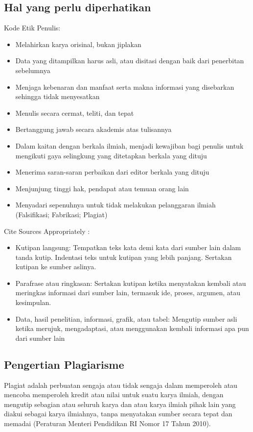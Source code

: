 \documentclass{article}
\begin{document}
\subsection{Hal yang perlu diperhatikan}
Kode Etik Penulis:
\begin{itemize}
    \item Melahirkan karya orisinal, bukan jiplakan
    \item Data yang ditampilkan harus asli, atau disitasi dengan baik dari penerbitan sebelumnya
    \item Menjaga kebenaran dan manfaat serta makna informasi yang disebarkan sehingga tidak menyesatkan
    \item Menulis secara cermat, teliti, dan tepat
    \item Bertanggung jawab secara akademis atas tulisannya
    \item Dalam kaitan dengan berkala ilmiah, menjadi kewajiban bagi penulis untuk mengikuti gaya selingkung yang ditetapkan berkala yang dituju
    \item Menerima saran-saran perbaikan dari editor berkala yang dituju
    \item Menjunjung tinggi hak, pendapat atau temuan orang lain
    \item Menyadari sepenuhnya untuk tidak melakukan pelanggaran ilmiah (Falsifikasi; Fabrikasi; Plagiat)
\end{itemize}
Cite Sources Appropriately :
\begin{itemize}
    \item Kutipan langsung: Tempatkan teks kata demi kata dari sumber lain dalam tanda kutip. Indentasi teks untuk kutipan yang lebih panjang. Sertakan kutipan ke sumber aslinya.
    \item Parafrase atau ringkasan: Sertakan kutipan ketika menyatakan kembali atau meringkas informasi dari sumber lain, termasuk ide, proses, argumen, atau kesimpulan.
    \item Data, hasil penelitian, informasi, grafik, atau tabel: Mengutip sumber asli ketika merujuk, mengadaptasi, atau menggunakan kembali informasi apa pun dari sumber lain
\end{itemize}

\subsection{Pengertian Plagiarisme}
Plagiat adalah perbuatan sengaja atau tidak sengaja dalam memperoleh atau mencoba memperoleh kredit atau nilai untuk suatu karya ilmiah, dengan mengutip sebagian atau seluruh karya dan atau karya ilmiah pihak lain yang diakui sebagai karya ilmiahnya, tanpa menyatakan sumber secara tepat dan memadai (Peraturan Menteri Pendidikan RI Nomor 17 Tahun 2010).
\end{document}
